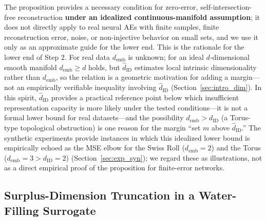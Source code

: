 \documentclass[make,article,submit,pdftex,moreauthors]{Definitions/mdpi}
\newcommand{\dID}{d_{\mathrm{ID}}}
\newcommand{\hatdID}{\hat{d}_{\mathrm{ID}}}
\newcommand{\demb}{d_{\mathrm{emb}}}
\begin{document}
The proposition provides a necessary condition for zero-error,
self-intersection-free reconstruction \textbf{under an idealized
continuous-manifold assumption}; it does not directly apply to real neural
AEs with finite samples, finite reconstruction error, noise, or
non-injective behavior on small sets, and we use it only as an approximate
guide for the lower end.
This is the rationale for the lower end of Step 2.
For real data $\demb$ is unknown; for an ideal $d$-dimensional smooth
manifold $\demb \geq d$ holds, but $\hatdID$ estimates local intrinsic
dimensionality rather than $\demb$, so the relation is a geometric
motivation for adding a margin---not an empirically verifiable inequality
involving $\hatdID$ (Section~\ref{sec:intro_dim}).
In this spirit, $\hatdID$ provides a practical reference point below which
insufficient representation capacity is more likely under the tested
conditions---it is not a formal lower bound for real datasets---and the
possibility $\demb > \dID$ (a
Torus-type topological obstruction) is one reason for the margin ``set $m$
above $\hatdID$.''
The synthetic experiments provide instances in which this idealized lower
bound is empirically echoed as the MSE elbow for the Swiss Roll
($\demb = 2$) and the Torus ($\demb = 3 > \dID = 2$)
(Section~\ref{sec:exp_syn}); we regard these as illustrations, not as a
direct empirical proof of the proposition for finite-error networks.

\subsection{Surplus-Dimension Truncation in a Water-Filling Surrogate}\label{sec:theory_wf}
\end{document}
